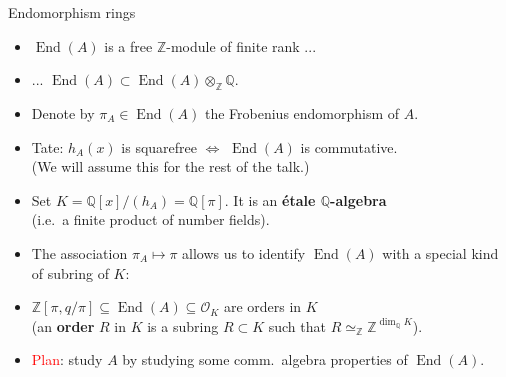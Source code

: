 \documentclass[usenames,dvipsnames,handout]{beamer}
\def\Q{\mathbb{Q}}
\def\Z{\mathbb{Z}}
\def\F{\mathbb{F}}
\DeclareMathOperator{\End}{End}
\DeclareMathOperator{\Jac}{Jac}
\newcommand{\cO}{{\mathcal O}}
\newcommand{\red}[1]{\textcolor{red}{#1}}
\begin{document}
\begin{frame}{ Endomorphism rings }
	\begin{itemize}
    \item $\End(A)$ is a free $\Z$-module of finite rank ... 
\pause 
    \item ... $\End(A) \subset \End(A)\otimes_\Z\Q$.
\pause 
    \item Denote by $\pi_A\in \End(A)$ the Frobenius endomorphism of $A$.
\pause 
    \item Tate: $h_A(x)$ is squarefree $\iff$ $\End(A)$ is commutative.\\
    (We will assume this for the rest of the talk.)
\pause 
    \item Set $K=\Q[x]/(h_A) = \Q[\pi]$. It is an {\bf \'etale $\Q$-algebra}\\
    (i.e.~a finite product of number fields).
\pause 
    \item The association $\pi_A \mapsto \pi$ allows us to identify $\End(A)$ with a special kind of subring of $K$:
\pause 
    \item $\Z[\pi,q/\pi] \subseteq \End(A) \subseteq \cO_K$ are orders in $K$\\
    (an {\bf order} $R$ in $K$ is a subring $R\subset K$ such that $R\simeq_\Z \Z^{\dim_\Q K}$).
\pause 
    \item 
    \red{Plan}: study $A$ by studying some comm.~algebra properties of $\End(A)$.
	\end{itemize}
\end{frame}

\end{document}

